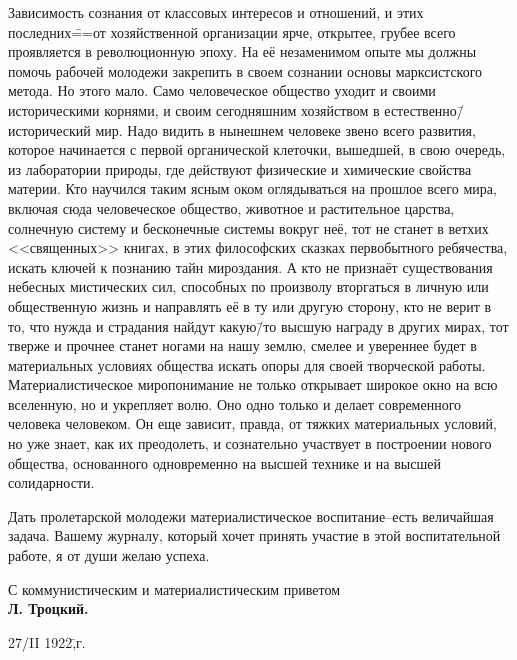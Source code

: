 Зависимость сознания от классовых интересов и отношений, и этих последних\===от хозяйственной организации ярче, открытее, грубее всего проявляется в революционную эпоху. На её незаменимом опыте мы должны помочь рабочей молодежи закрепить в своем сознании основы марксистского метода. Но этого мало. Само человеческое общество уходит и своими историческими корнями, и своим сегодняшним хозяйством в естественно\=/исторический мир. Надо видить в нынешнем человеке звено всего развития, которое начинается с первой органической клеточки, вышедшей, в свою очередь, из лаборатории природы, где действуют физические и химические свойства материи. Кто научился таким ясным оком оглядываться на прошлое всего мира, включая сюда человеческое общество, животное и растительное царства, солнечную систему и бесконечные системы вокруг неё, тот не станет в ветхих <<священных>> книгах, в этих философских сказках первобытного ребячества, искать ключей к познанию тайн мироздания. А кто не признаёт существования небесных мистических сил, способных по произволу вторгаться в личную или общественную жизнь и направлять её в ту или другую сторону, кто не верит в то, что нужда и страдания найдут какую\=/то высшую награду в других мирах, тот тверже и прочнее станет ногами на нашу землю, смелее и увереннее будет в материальных условиях общества искать опоры для своей творческой работы. Материалистическое миропонимание не только открывает широкое окно на всю вселенную, но и укрепляет волю. Оно одно только и делает современного человека человеком. Он еще зависит, правда, от тяжких материальных условий, но уже знает, как их преодолеть, и сознательно участвует в построении нового общества, основанного одновременно на высшей технике и на высшей солидарности.

Дать пролетарской молодежи материалистическое воспитание\---есть величайшая задача. Вашему журналу, который хочет принять участие в этой воспитательной работе, я от души желаю успеха.

\begin{flushright}
 С коммунистическим и материалистическим приветом\\
 \textbf{Л. Троцкий.}\hspace*{3em}
\end{flushright}

27/II 1922\=,г.
